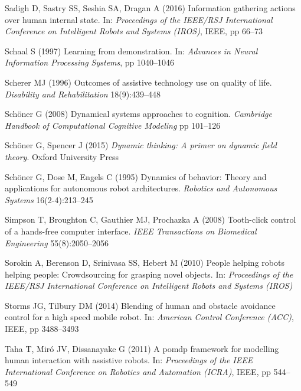 \documentclass[natbib, twocolumn]{svjour3}          %
\begin{document}
\begin{thebibliography}{54}
	Sadigh D, Sastry SS, Seshia SA, Dragan A (2016{}) Information
	gathering actions over human internal state. In: \textit{Proceedings of the
		IEEE/RSJ International Conference on Intelligent Robots and Systems (IROS)},
	IEEE, pp 66--73
	
	Schaal S (1997) Learning from demonstration. In: \textit{Advances in Neural
		Information Processing Systems}, pp 1040--1046
	
	Scherer MJ (1996) Outcomes of assistive technology use on quality of life.
	\textit{Disability and Rehabilitation} 18(9):439--448
	
	Sch{\"o}ner G (2008) Dynamical systems approaches to cognition.
	\textit{Cambridge Handbook of Computational Cognitive Modeling} pp 101--126
	
	Sch{\"o}ner G, Spencer J (2015) \textit{Dynamic thinking: A primer on dynamic
		field theory}. Oxford University Press
	
	Sch{\"o}ner G, Dose M, Engels C (1995) Dynamics of behavior: Theory and
	applications for autonomous robot architectures. \textit{Robotics and
		Autonomous Systems} 16(2-4):213--245
	
	Simpson T, Broughton C, Gauthier MJ, Prochazka A (2008) Tooth-click control of
	a hands-free computer interface. \textit{IEEE Transactions on Biomedical
		Engineering} 55(8):2050--2056
	
	Sorokin A, Berenson D, Srinivasa SS, Hebert M (2010) People helping robots
	helping people: Crowdsourcing for grasping novel objects. In:
	\textit{Proceedings of the IEEE/RSJ International Conference on Intelligent
		Robots and Systems (IROS)}
	
	Storms JG, Tilbury DM (2014) Blending of human and obstacle avoidance control
	for a high speed mobile robot. In: \textit{American Control Conference
		(ACC)}, IEEE, pp 3488--3493
	
	Taha T, Mir{\'o} JV, Dissanayake G (2011) A pomdp framework for modelling human
	interaction with assistive robots. In: \textit{Proceedings of the IEEE
		International Conference on Robotics and Automation (ICRA)}, IEEE, pp
	544--549
	

\end{thebibliography}
\end{document}
